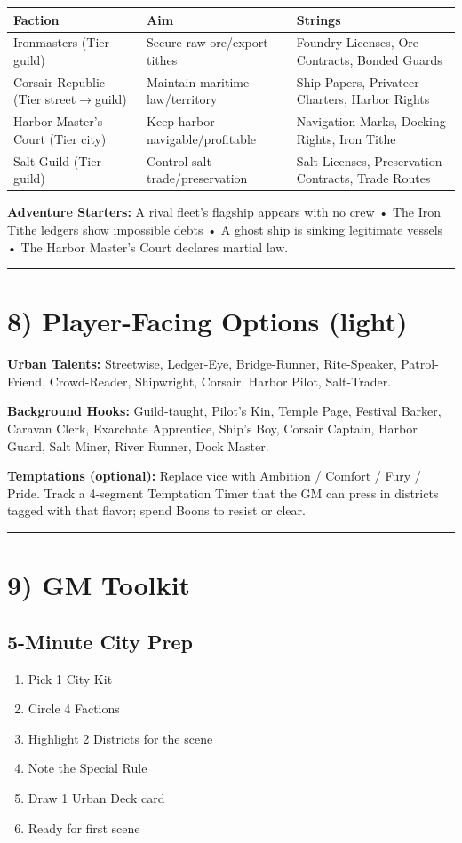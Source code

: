 \documentclass[11pt]{article}
\newcommand{\sectionrule}{\vspace{0.5em}\noindent\textcolor{gray}{\rule{\textwidth}{0.4pt}}\par\vspace{0.5em}}
\begin{document}
\begin{tabular}{@{}p{3cm}p{3.5cm}p{3.5cm}@{}}
\toprule
Faction & Aim & Strings \\
\midrule
Ironmasters (Tier guild) & Secure raw ore/export tithes & Foundry Licenses, Ore Contracts, Bonded Guards \\
Corsair Republic (Tier street$\rightarrow$guild) & Maintain maritime law/territory & Ship Papers, Privateer Charters, Harbor Rights \\
Harbor Master's Court (Tier city) & Keep harbor navigable/profitable & Navigation Marks, Docking Rights, Iron Tithe \\
Salt Guild (Tier guild) & Control salt trade/preservation & Salt Licenses, Preservation Contracts, Trade Routes \\
\bottomrule
\end{tabular}

\textbf{Adventure Starters:} A rival fleet's flagship appears with no crew • The Iron Tithe ledgers show impossible debts • A ghost ship is sinking legitimate vessels • The Harbor Master's Court declares martial law.

\sectionrule

\section*{8) Player-Facing Options (light)}
\textbf{Urban Talents:} Streetwise, Ledger-Eye, Bridge-Runner, Rite-Speaker, Patrol-Friend, Crowd-Reader, Shipwright, Corsair, Harbor Pilot, Salt-Trader.  

\textbf{Background Hooks:} Guild-taught, Pilot's Kin, Temple Page, Festival Barker, Caravan Clerk, Exarchate Apprentice, Ship's Boy, Corsair Captain, Harbor Guard, Salt Miner, River Runner, Dock Master.  

\textbf{Temptations (optional):} Replace vice with Ambition / Comfort / Fury / Pride. Track a 4-segment Temptation Timer that the GM can press in districts tagged with that flavor; spend Boons to resist or clear.

\sectionrule

\section*{9) GM Toolkit}
\subsection*{5-Minute City Prep}
\begin{enumerate}
    \item Pick 1 City Kit
    \item Circle 4 Factions
    \item Highlight 2 Districts for the scene
    \item Note the Special Rule
    \item Draw 1 Urban Deck card
    \item Ready for first scene
\end{enumerate}
\end{document}
